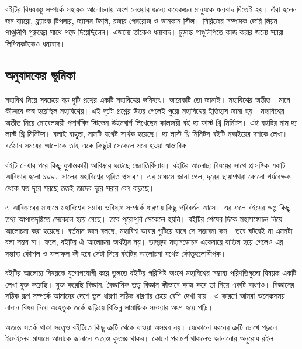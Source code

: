 \documentclass[
]{book}
\begin{document}
বইটির বিষয়বস্তু সম্পর্কে সহায়ক আলোচনায় অংশ নেওয়ার জন্যে কয়েকজন মানুষকে ধন্যবাদ দিতেই হয়। এঁরা হলেন জন ব্যারো, ফ্র্যাংক টিপলার, জ্যাসন টমলি, রজার পেনরোজ ও ডানকান স্টিল। সিরিজের সম্পাদক জেরি লিয়ন পাণ্ডুলিপি গুরুত্বের সাথে পড়ে দিয়েছিলেন। এজন্যে তাঁকেও ধন্যবাদ। চূড়ান্ত পাণ্ডুলিপিতে কাজ করার জন্যে স্যারা লিপিনকটকেও ধন্যবাদ।

\hypertarget{ux985ux9a8ux9c1ux9acux9beux9a6ux995ux9c7ux9b0-ux9adux9c2ux9aeux9bfux995ux9be}{%
\subsection{অনুবাদকের ভূমিকা}\label{ux985ux9a8ux9c1ux9acux9beux9a6ux995ux9c7ux9b0-ux9adux9c2ux9aeux9bfux995ux9be}}

মহাবিশ্ব নিয়ে সবচেয়ে বড় দুটি প্রশ্নের একটি মহাবিশ্বের ভবিষ্যৎ। আরেকটি তো জানাই। মহাবিশ্বের অতীত। মানে কীভাবে জন্ম হয়েছিল মহাবিশ্বের। এই দুটো প্রশ্নের উত্তর পেলেই পুরো মহাবিশ্বের ইতিহাস জানা হয়। মহাবিশ্বের অতীত নিয়ে নোবেলজয়ী পদার্থবিদ স্টিভেন উইনবার্গ লিখেছেন কালজয়ী বই দ্য ফার্স্ট থ্রি মিনিটস। এই বইটির নাম দ্য লাস্ট থ্রি মিনিটস। বলাই বাহুল্য, নামটি যথেষ্ট সার্থক হয়েছে। দ্য লাস্ট থ্রি মিনিটস বইটি নব্বইয়ের দশকে লেখা। বর্তমান সময়ের আলোকে তাই একে কিছুটা সেকেলে মনে হওয়া স্বাভাবিক।

বইটি লেখার পরে কিছু যুগান্তকারী আবিষ্কার ঘটেছে জ্যোতির্বিদ্যায়। বইটির আলোচ্য বিষয়ের সাথে প্রাসঙ্গিক একটি আবিষ্কার হলো ১৯৯৮ সালের মহাবিশ্বের ত্বরিত প্রসারণ। এর মাধ্যমে জানা গেল, দূরের ছায়াপথরা কোনো পর্যবেক্ষক থেকে যত দূরে সরছে ততই তাদের দূরে সরার বেগ বাড়ছে।

এ আবিষ্কারের মাধ্যমে মহাবিশ্বের সম্ভাব্য ভবিষ্যৎ সম্পর্কে ধারণায় কিছু পরিবর্তন আসে। এর ফলে বইয়ের অল্প কিছু তথ্য আপাতদৃষ্টিতে সেকেলে হয়ে গেছে। তবে পুরোপুরি সেকেলে হয়নি। বইটির শেষের দিকে মহাসঙ্কোচন নিয়ে আলোচনা করা হয়েছে। বর্তমান জ্ঞান বলছে, মহাবিশ্ব আবার গুটিয়ে যাবে সে সম্ভাবনা কম। তবে ঘটবেই না এমনটা বলা সম্ভব না। ফলে, বইটির ঐ আলোচনা অর্থহীন নয়। তাছাড়া মহাসঙ্কোচন একেবারে বাতিল হয়ে গেলেও এর সম্ভাব্য কৌশল ও ফলাফল কী হবে সেটা নিয়ে বইটির আলোচনা যথেষ্ট কৌতূহলোদ্দীপক।

বইটির আলোচ্য বিষয়কে যুগোপযোগী করে তুলতে বইটির পরিশিষ্ট অংশে মহাবিশ্বের সম্ভাব্য পরিণতিগুলো বিষয়ক একটি লেখা যুক্ত করেছি। যুক্ত করেছি বিজ্ঞান, বৈজ্ঞানিক তত্ত্ব বিজ্ঞান কীভাবে কাজ করে তা নিয়ে একটি অংশও। বিজ্ঞানের সঠিক রূপ সম্পর্কে আমাদের দেশে ভুল ধারণা সঠিক ধারণার চেয়ে বেশি দেখা যায়। এ কারণে আমরা অনেকসময় নানান বিষয় নিয়ে অহেতুক তর্কে জড়িয়ে বিভিন্ন সামাজিক সমস্যার অংশ হয়ে পড়ি।

অত্যন্ত সতর্ক থাকা সত্ত্বেও বইটিতে কিছু ত্রুটি থেকে যাওয়া অসম্ভব নয়। যেকোনো ধরনের ত্রুটি চোখে পড়লে ইমেইলের মাধ্যমে আমাকে জানালে অত্যন্ত কৃতজ্ঞ থাকব। কোনো পরামর্শ থাকলেও জানানোর অনুরোধ রইল।
\end{document}
